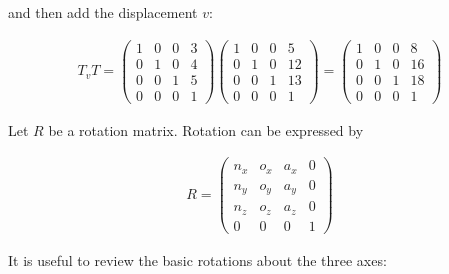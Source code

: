 and then add the displacement \(v\):

\[\begin{aligned}
T_v T =  \begin{pmatrix}1 & 0 & 0 & 3 \\ 0 & 1 & 0 & 4\\ 0 &0 & 1 & 5 \\ 0& 0& 0& 1 \end{pmatrix}
\begin{pmatrix}1 & 0 & 0 & 5 \\ 0 & 1 & 0 & 12\\ 0 &0 & 1 & 13 \\ 0& 0& 0& 1 \end{pmatrix}
= \begin{pmatrix}1 & 0 & 0 & 8 \\ 0 & 1 & 0 & 16\\ 0 &0 & 1 & 18 \\ 0& 0& 0& 1 \end{pmatrix}
\end{aligned}\]

Let \(R\) be a rotation matrix. Rotation can be expressed by

\[\begin{aligned}
R = \begin{pmatrix}
         n_x & o_x & a_x & 0 \\
         n_y & o_y & a_y & 0\\
         n_z & o_z & a_z & 0 \\
         0  &  0  &  0 & 1 \end{pmatrix}
\end{aligned}\]

It is useful to review the basic rotations about the three axes:

